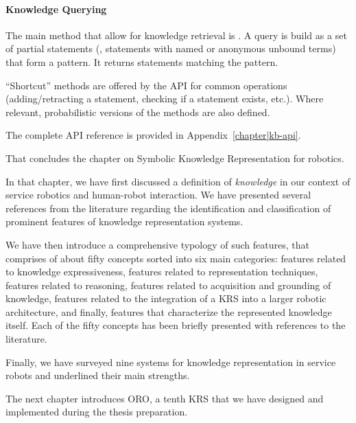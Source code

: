 \paragraph{Knowledge Querying} The main method that allow for knowledge
retrieval is . A  query is build as a set of partial
statements (\ie, statements with named or anonymous unbound terms) that form a
pattern. It returns statements matching the pattern.

``Shortcut'' methods are offered by the API for common operations
(adding/retracting a statement, checking if a statement exists, etc.). Where
relevant, probabilistic versions of the methods are also defined.

The complete API reference is provided in Appendix~\ref{chapter|kb-api}.


\recap

That concludes the chapter on Symbolic Knowledge Representation for robotics.

In that chapter, we have first discussed a definition of \emph{knowledge} in
our context of service robotics and human-robot interaction. We have presented
several references from the literature regarding the identification and
classification of prominent features of knowledge representation systems. 

We have then introduce a comprehensive typology of such features, that
comprises of about fifty concepts sorted into six main categories: features
related to knowledge expressiveness, features related to representation
techniques, features related to reasoning, features related to acquisition and
grounding of knowledge, features related to the integration of a KRS into a
larger robotic architecture, and finally, features that characterize the
represented knowledge itself. Each of the fifty concepts has been briefly
presented with references to the literature.

Finally, we have surveyed nine systems for knowledge representation in service
robots and underlined their main strengths.

The next chapter introduces ORO, a tenth KRS that we have designed and
implemented during the thesis preparation.

